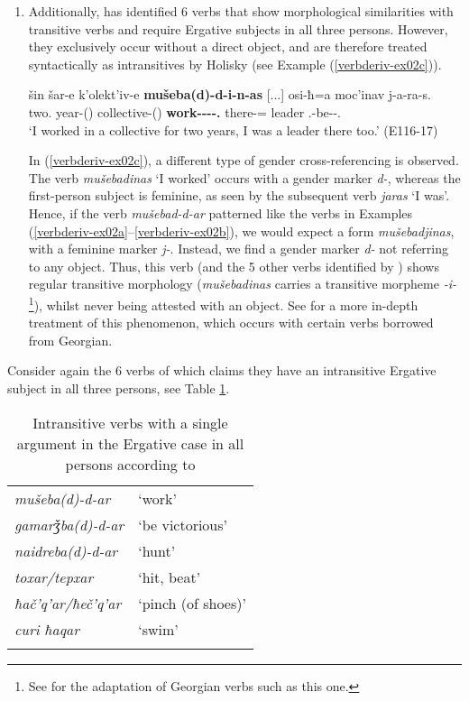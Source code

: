 \begin{enumerate}
\item Additionally, \textcite[]{holisky87} has identified 6 verbs that show morphological similarities with transitive verbs and require Ergative subjects in all three persons. However, they exclusively occur without a direct object, and are therefore treated syntactically as intransitives by Holisky (see Example (\ref{verbderiv-ex02c})). 

\begin{exe}
	
	\ex\label{verbderiv-ex02c}
	\gll šin šar-e k'olekt'iv-e \textbf{mušeba(d)-d-i-n-as} [...] osi-ħ=a moc'inav j-a-ra-s. \\
	two.{\Obl} year-{\Obl}({\Ess}) collective-{\Obl}({\Ess}) \textbf{work-{\D}-{\Tr}-{\Aor}-{\Fsg}.\textbf{{\Erg}}} {} there-{\Ess}={\Add} leader {\F}.{\Sg}-be-{\Imprf}-{\Fsg}.{\Nom} \\
	\trans `I worked in a collective for two years, I was a leader there too.'
	\hfill (E116-17)
\end{exe}

In (\ref{verbderiv-ex02c}), a different type of gender cross-referencing is observed. The verb \textit{mušebadinas} `I worked' occurs with a gender marker \textit{d-}, whereas the first-person subject is feminine, as seen by the subsequent verb \textit{jaras} `I was'. Hence, if the verb \textit{mušebad-d-ar} patterned like the verbs in Examples (\ref{verbderiv-ex02a}--\ref{verbderiv-ex02b}), we would expect a form \textit{mušebadjinas}, with a feminine marker \textit{j-}. Instead, we find a gender marker \textit{d-} not referring to any object. Thus, this verb (and the 5 other verbs identified by \cite{holisky87}) shows regular transitive morphology (\textit{mušebadinas} carries a transitive morpheme \textit{-i-}\footnote{See  for the adaptation of Georgian verbs such as this one.}), whilst never being attested with an object. See  for a more in-depth treatment of this phenomenon, which occurs with certain verbs borrowed from Georgian.
\end{enumerate}

Consider again the 6 verbs of which \textcite{holisky87} claims they have an intransitive Ergative subject in all three persons, see Table  \ref{verbderiv-table-ergativeholisky}.

\begin{table}
	\begin{tabular}{ll}
		\lsptoprule
		\textit{mušeba(d)-d-ar} & `work' \\
		\textit{gamarǯba(d)-d-ar} & `be victorious' \\
		\textit{naidreba(d)-d-ar} & `hunt' \\ 
		\textit{toxar/tepxar} & `hit, beat' \\
		\textit{ħač'q'ar/ħeč'q'ar} & `pinch (of shoes)' \\
		\textit{curi ħaqar} &  `swim' \\
		\lspbottomrule
	\end{tabular}
	\caption{Intransitive verbs with a single argument in the Ergative case in all persons according to \textcites[188--189]{holisky84}}
	\label{verbderiv-table-ergativeholisky}
\end{table}

